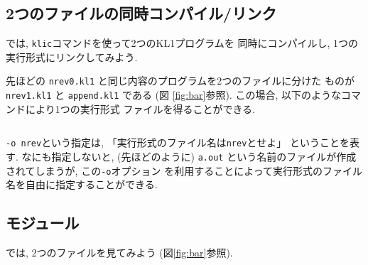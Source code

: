 \documentclass[a4,titlepage]{jsreport}
\begin{document}
\subsection{2つのファイルの同時コンパイル/リンク}
では, \verb|klic|コマンドを使って2つのKL1プログラムを
同時にコンパイルし, 1つの実行形式にリンクしてみよう.  

先ほどの {\tt nrev0.kl1} と同じ内容のプログラムを2つのファイルに分けた
ものが {\tt nrev1.kl1} と {\tt append.\linebreak[1]kl1} である (図
\ref{fig:bar}参照).  この場合, 以下のようなコマンドにより1つの実行形式
ファイルを得ることができる.

\begin{Verbatim}[frame=single]
% klic -o nrev nrev1.kl1 append.kl1
\end{Verbatim}

\verb|-o nrev|という指定は, 「実行形式のファイル名は\verb|nrev|とせよ」
ということを表す.  なにも指定しないと, (先ほどのように) \verb|a.out|
という名前のファイルが作成されてしまうが, この\verb|-o|オプション
を利用することによって実行形式のファイル名を自由に指定することができる.  

\subsection{モジュール}
では, 2つのファイルを見てみよう (図\ref{fig:bar}参照).  
\end{document}
